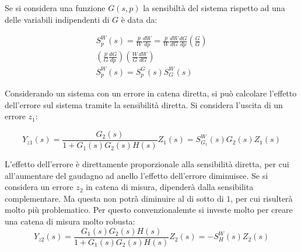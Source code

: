 \documentclass{article}
\numberwithin{equation}{subsection}
\begin{document}
Se si considera una funzione $G(s,p)$ la sensibiltà del sistema rispetto ad una delle variabili indipendenti di $G$ è data da:

\begin{gather}
    S^W_p(s)=\displaystyle\frac{p}{W}\frac{dW}{dp}=\frac{p}{W}\frac{dW}{dG}\frac{dG}{dp}\left(\frac{G}{G}\right)\\
    \left(\frac{p}{G}\frac{dG}{dp}\right)\left(\frac{W}{G}\frac{dW}{dG}\right)\\
    S^W_p(s)=S^G_p(s)S^W_G(s)
\end{gather}

Considerando un sistema con un errore in catena diretta, si può calcolare l'effetto dell'errore sul sistema tramite la sensibilità diretta. Si considera l'uscita 
di un errore $z_1$:

\begin{equation}
    Y_{z1}(s)=\displaystyle\frac{G_2(s)}{1+G_1(s)G_2(s)H(s)}Z_1(s)=S^W_{G_1}(s)G_2(s)Z_1(s)
\end{equation}

L'effetto dell'errore è direttamente proporzionale alla sensibilità diretta, per cui all'aumentare del gaudagno ad anello l'effetto dell'errore diminuisce.  
Se si considera un errore $z_2$ in catena di misura, dipenderà dalla sensibilita complementare. Ma questa non potrà diminuire al di sotto di $1$, per cui risulterà molto più 
problematico. Per questo convenzionalemte si investe molto per creare una catena di misura molto robusta: 
\begin{equation}
    Y_{z2}(s)=\displaystyle\frac{G_1(s)G_2(s)H(s)}{1+G_1(s)G_2(s)H(s)}Z_2(s)=-S^W_H(s)Z_2(s)
\end{equation}
\end{document}
